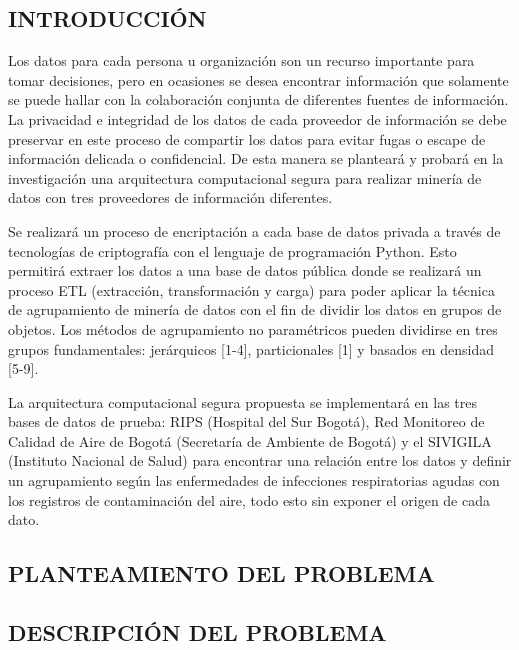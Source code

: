 \documentclass[a4paper, 12pt, oneside]{article}
\theoremstyle{definition}
\theoremstyle{remark}
\begin{document}
\begin{center}
 \section{INTRODUCCIÓN}
 \end{center}
 
 Los datos para cada persona u organización son un recurso importante para tomar decisiones, pero  en ocasiones se desea encontrar información que solamente se puede hallar con la colaboración conjunta de diferentes fuentes de información. La privacidad e integridad de los datos de cada proveedor de información se debe preservar en este proceso de compartir los datos para evitar fugas o escape de información delicada o confidencial. De esta manera se planteará y probará en la investigación una arquitectura computacional segura para realizar minería de datos con tres proveedores de información diferentes.

Se realizará un proceso de encriptación a cada base de datos privada a través de tecnologías de criptografía con el lenguaje de programación Python. Esto permitirá extraer los datos a una base de datos pública donde se realizará un proceso ETL (extracción, transformación y carga) para poder aplicar la técnica de agrupamiento de minería de datos con el fin de dividir los datos en grupos de objetos. Los métodos de agrupamiento no paramétricos pueden dividirse en tres grupos fundamentales: jerárquicos [1-4], particionales [1] y basados en densidad [5-9].

La arquitectura computacional segura propuesta se implementará en las tres bases de datos de prueba: RIPS (Hospital del Sur Bogotá), Red Monitoreo de Calidad de Aire de Bogotá (Secretaría de Ambiente de Bogotá) y el SIVIGILA (Instituto Nacional de Salud) para encontrar una relación entre los datos y definir un agrupamiento según las enfermedades de infecciones respiratorias agudas con los registros de contaminación del aire, todo esto sin exponer el origen de cada dato.

\clearpage

\begin{center}
 \section{PLANTEAMIENTO DEL PROBLEMA}
 \end{center}

\subsection{DESCRIPCIÓN DEL PROBLEMA}
\end{document}

